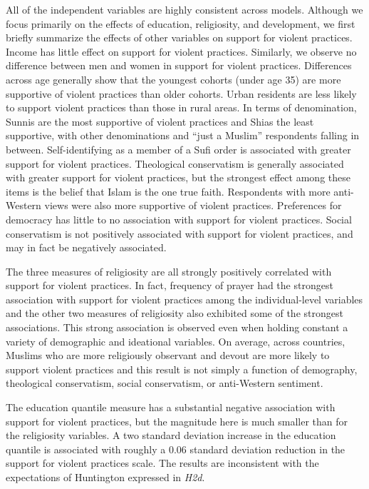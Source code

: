 \documentclass[10pt,letterpaper]{article}
\begin{document}
All of the independent variables are highly consistent across models. Although we focus primarily on the effects of education, religiosity, and development, we first briefly summarize the effects of other variables on support for violent practices. Income has little effect on support for violent practices. Similarly, we observe no difference between men and women in support for violent practices. Differences across age generally show that the youngest cohorts (under age 35) are more supportive of violent practices than older cohorts. Urban residents are less likely to support violent practices than those in rural areas. In terms of denomination, Sunnis are the most supportive of violent practices and Shias the least supportive, with other denominations and ``just a Muslim'' respondents falling in between. Self-identifying as a member of a Sufi order is associated with greater support for violent practices. Theological conservatism is generally associated with greater support for violent practices, but the strongest effect among these items is the belief that Islam is the one true faith. Respondents with more anti-Western views were also more supportive of violent practices. Preferences for democracy has little to no association with support for violent practices. Social conservatism is not positively associated with support for violent practices, and may in fact be negatively associated.

The three measures of religiosity are all strongly positively correlated with support for violent practices. In fact, frequency of prayer had the strongest association with support for violent practices among the individual-level variables and the other two measures of religiosity also exhibited some of the strongest associations. This strong association is observed even when holding constant a variety of demographic and ideational variables. On average, across countries, Muslims who are more religiously observant and devout are more likely to support violent practices and this result is not simply a function of demography, theological conservatism, social conservatism, or anti-Western sentiment.

The education quantile measure has a substantial negative association with support for violent practices, but the magnitude here is much smaller than for the religiosity variables. A two standard deviation increase in the education quantile is associated with roughly a 0.06 standard deviation reduction in the support for violent practices scale. The results are inconsistent with the expectations of Huntington expressed in \emph{H2d}.
\end{document}
